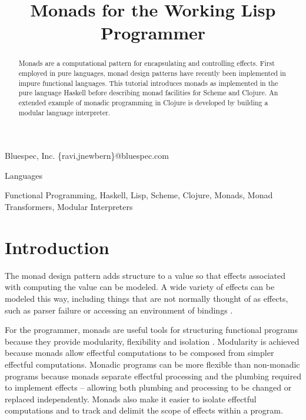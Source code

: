 \documentclass[natbib,10pt]{sigplanconf}
\begin{document}
\copyrightdata{[to be supplied]}
\toappear{}


\title{Monads for the Working Lisp Programmer}

           {Bluespec, Inc.}
           {\{ravi,jnewbern\}@bluespec.com}

\maketitle

\begin{abstract}

Monads are a computational pattern for encapsulating and controlling
effects.  First employed in pure languages, monad design patterns have
recently been implemented in impure functional languages.  This
tutorial introduces monads as implemented in the pure language Haskell
before describing monad facilities for Scheme and Clojure.  An extended
example of monadic programming in Clojure is developed by building a
modular language interpreter.

\end{abstract}


\terms
Languages

\keywords
Functional Programming, Haskell, Lisp, Scheme, Clojure, Monads, Monad Transformers, Modular Interpreters 

\section{Introduction}

The monad design pattern adds structure to a value so that effects
associated with computing the value can be modeled.  A wide variety of
effects can be modeled this way, including things that are not
normally thought of as effects, such as parser failure or accessing an
environment of bindings
\citep{moggi-monads,wadlermonads, parser-combinators}.

For the programmer, monads are useful tools for structuring functional
programs because they provide modularity, flexibility and isolation
\citep{all-about-monads, pureshirt}.
Modularity is achieved because monads allow effectful computations to
be composed from simpler effectful computations. Monadic programs can be
more flexible than non-monadic programs because monads separate
effectful processing and the plumbing required to implement effects --
allowing both plumbing and processing to be changed or replaced
independently. Monads also make it easier to isolate effectful
computations and to track and delimit the scope of effects within a
program.
\end{document}
